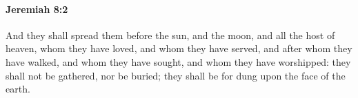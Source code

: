 
		\paragraph{Jeremiah 8:2} %
			\label{JEREMIAH-8-2}

			And they shall spread them before the sun, and the moon, and all the host of heaven, whom they have loved, and whom they have served, and after whom they have walked, and whom they have sought, and whom they have worshipped: they shall not be gathered, nor be buried; they shall be for dung upon the face of the earth.


